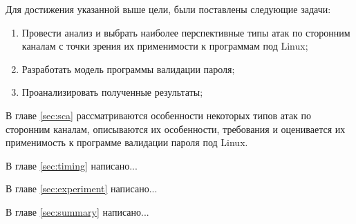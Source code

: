 Для достижения указанной выше цели, были поставлены следующие задачи:
\begin{enumerate}
\item Провести анализ и выбрать наиболее перспективные типы атак по сторонним
  каналам с точки зрения их применимости к программам под Linux;
\item Разработать модель программы валидации пароля;
\item Проанализировать полученные результаты;
\end{enumerate}

В главе \ref{sec:sca} рассматриваются особенности некоторых типов атак по
сторонним каналам, описываются их особенности, требования и оценивается
их применимость к программе валидации пароля под Linux.

В главе \ref{sec:timing} написано...

В главе \ref{sec:experiment} написано...

В главе \ref{sec:summary} написано...

\clearpage
